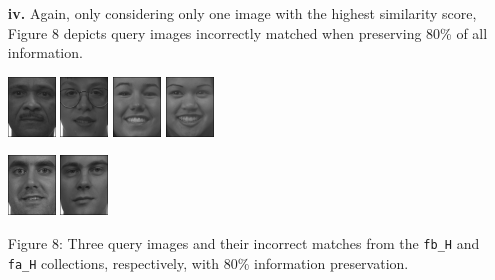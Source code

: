 \documentclass[ 12pt ]{article}
\begin{document}
\begin{enumerate}
\begin{enumerate}
            \item[\textbf{iv.}] Again, only considering only one image with the highest similarity score, Figure 8 depicts query images incorrectly matched when preserving 80\% of all
                information.
                \newpage
                \begin{center}
                    \includegraphics[scale=1.7]{f_h_images/AnyConv.com__00183_940128_fb}
                    \includegraphics[scale=1.7]{f_h_images/AnyConv.com__00276_940422_fa_a}
                    \includegraphics[scale=1.7]{f_h_images/AnyConv.com__00451_940422_fb}
                    \includegraphics[scale=1.7]{f_h_images/AnyConv.com__00410_940422_fa}
                \end{center}
                \begin{center}
                    \includegraphics[scale=1.7]{f_h_images/AnyConv.com__00594_941031_fb}
                    \includegraphics[scale=1.7]{f_h_images/AnyConv.com__00002_940128_fa}
                \end{center}
                \begin{center}
                    \scriptsize
                    Figure 8: Three query images and their incorrect matches from the \verb|fb_H| and \verb|fa_H| collections, respectively, with 80\% information
                    preservation.
                \end{center}


\end{enumerate}
\end{enumerate}
\end{document}
